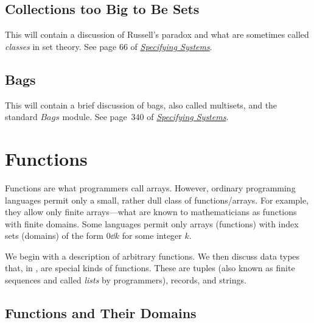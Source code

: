 \documentclass[fleqn,leqno]{article}
\begin{document}
\subsection[\puce Collections too Big to Be Sets]{\puce Collections too Big to Be 
   Sets%
   }%

This will contain a discussion of Russell's paradox and what are
sometimes called \emph{classes} in set theory.  See page 66 of
   \hyperref{http://research.microsoft.com/en-us/um/people/lamport/tla/book.html}{}{}{\emph{Specifying Systems}}.

\newpage

\subsection[\puce Bags]{\puce Bags%
}

This will contain a brief discussion of bags, also called multisets, and
the standard $Bags$ module.
See page~340 of
   \hyperref{http://research.microsoft.com/en-us/um/people/lamport/tla/book.html}{}{}{\emph{Specifying Systems}}.

  
\section[Functions]{Functions%
 }

Functions are what programmers call 
arrays.  However, ordinary
programming languages permit only a small, rather dull class of
functions/arrays.  For example, they allow only finite arrays---what
are known to mathematicians as functions with finite domains.  Some
languages permit only arrays (functions) with index sets (domains) of
the form $0\dd k$ for some integer $k$.


We begin with a description of arbitrary functions.  We then
discuss data types that, in \tlaplus, are special kinds of functions.
These are tuples (also known as finite sequences and called \emph{lists}
by programmers), records, and strings.


%
\subsection[Functions and Their Domains]{Functions and Their Domains} \label{function-domains}
\end{document}

